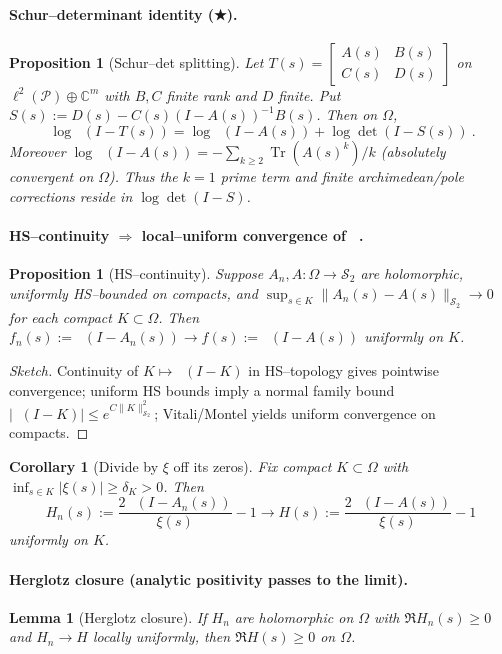 \documentclass[11pt]{article}
\newtheorem{proposition}[theorem]{Proposition}
\newtheorem{lemma}[theorem]{Lemma}
\newtheorem{corollary}[theorem]{Corollary}
\theoremstyle{remark}
\newcommand{\C}{\mathbb{C}}
\newcommand{\PP}{\mathcal{P}}
\newcommand{\HS}{\mathcal{S}_2}
\DeclareMathOperator{\Tr}{Tr}
\DeclareMathOperator{\dettwo}{det_2}
\begin{document}
\paragraph{Schur--determinant identity (★).}
\begin{proposition}[Schur--det splitting] \label{prop:star}
Let $T(s)=\begin{bmatrix}A(s)&B(s)\\ C(s)&D(s)\end{bmatrix}$ on $\ell^2(\PP)\oplus\C^m$ with $B,C$ finite rank and $D$ finite. Put $S(s):=D(s)-C(s)(I-A(s))^{-1}B(s)$. Then on $\Omega$,
\[
\boxed{\ \log\dettwo(I-T(s))=\log\dettwo(I-A(s))+\log\det(I-S(s))\ }.
\]
Moreover $\log\dettwo(I-A(s))=-\sum_{k\ge2}\Tr(A(s)^k)/k$ (absolutely convergent on $\Omega$). Thus the $k=1$ prime term and finite archimedean/pole corrections reside in $\log\det(I-S)$.
\end{proposition}

\paragraph{HS--continuity $\Rightarrow$ local--uniform convergence of $\dettwo$.}
\begin{proposition}[HS--continuity] \label{prop:HScont}
Suppose $A_n,A: \Omega\to\HS$ are holomorphic, uniformly HS--bounded on compacts, and $\sup_{s\in K}\|A_n(s)-A(s)\|_{\HS}\to 0$ for each compact $K\subset\Omega$. Then $f_n(s):=\dettwo(I-A_n(s))\to f(s):=\dettwo(I-A(s))$ uniformly on $K$.
\end{proposition}
\begin{proof}[Sketch] Continuity of $K\mapsto\dettwo(I-K)$ in HS--topology gives pointwise convergence; uniform HS bounds imply a normal family bound $|\dettwo(I-K)|\le e^{C\|K\|_{\HS}^2}$; Vitali/Montel yields uniform convergence on compacts.
\end{proof}

\begin{corollary}[Divide by $\xi$ off its zeros] \label{cor:divide}
Fix compact $K\subset\Omega$ with $\inf_{s\in K}|\xi(s)|\ge\delta_K>0$. Then
\[
H_n(s):=\frac{2\,\dettwo(I-A_n(s))}{\xi(s)}-1 \to H(s):=\frac{2\,\dettwo(I-A(s))}{\xi(s)}-1
\]
uniformly on $K$.
\end{corollary}

\paragraph{Herglotz closure (analytic positivity passes to the limit).}
\begin{lemma}[Herglotz closure] \label{lem:herg}
If $H_n$ are holomorphic on $\Omega$ with $\Re H_n(s)\ge 0$ and $H_n\to H$ locally uniformly, then $\Re H(s)\ge 0$ on $\Omega$.
\end{lemma}
\end{document}
